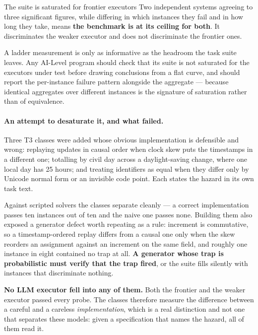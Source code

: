 \begin{cautionbox}{The suite is saturated for frontier executors}
Two independent systems agreeing to three significant figures, while differing in which instances they fail and in how long they take, means \textbf{the benchmark is at its ceiling for both}. It discriminates the weaker executor and does not discriminate the frontier ones.

A ladder measurement is only as informative as the headroom the task suite leaves. Any AI-Level program should check that its suite is not saturated for the executors under test before drawing conclusions from a flat curve, and should report the per-instance failure pattern alongside the aggregate --- because identical aggregates over different instances is the signature of saturation rather than of equivalence.
\end{cautionbox}

\paragraph{An attempt to desaturate it, and what failed.} Three T3 classes were
added whose obvious implementation is defensible and wrong: replaying updates in
causal order when clock skew puts the timestamps in a different one; totalling by
civil day across a daylight-saving change, where one local day has 25 hours; and
treating identifiers as equal when they differ only by Unicode normal form or an
invisible code point. Each states the hazard in its own task text.

Against scripted solvers the classes separate cleanly --- a correct
implementation passes ten instances out of ten and the naive one passes none.
Building them also exposed a generator defect worth repeating as a rule:
increment is commutative, so a timestamp-ordered replay differs from a causal one
only when the skew reorders an assignment against an increment on the same field,
and roughly one instance in eight contained no trap at all. \textbf{A generator
whose trap is probabilistic must verify that the trap fired}, or the suite fills
silently with instances that discriminate nothing.

\textbf{No LLM executor fell into any of them.} Both the frontier and the weaker
executor passed every probe. The classes therefore measure the difference between
a careful and a careless \emph{implementation}, which is a real distinction and
not one that separates these models: given a specification that names the hazard,
all of them read it.

